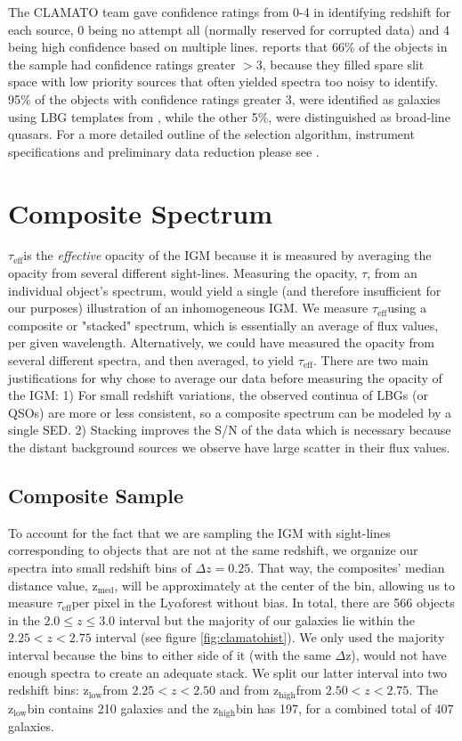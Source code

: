 \documentclass[preprint2,times,tighten]{aastex6}
\newcommand{\teff}{$\tau_\mathrm{eff}$\space}
\newcommand{\lya}{Ly$\alpha$\space}
\newcommand{\zem}{$\mathrm{z_{med}}$\space}
\newcommand{\hiz}{$\mathrm{z_{high}}$\space}
\newcommand{\loz}{$\mathrm{z_{low}}$\space}
\begin{document}
The CLAMATO team gave confidence ratings from 0-4 in identifying redshift for each source, 0 being no attempt all (normally reserved for corrupted data) and 4 being high confidence based on multiple lines. \cite{lee_first_2018} reports that 66\% of the objects in the sample had confidence ratings greater $> 3$, because they filled spare slit space with low priority sources that often yielded spectra too noisy to identify. 95\% of the objects with confidence ratings greater 3, were identified as galaxies using LBG templates from \cite{shapley_rest-frame_2003}, while the other 5\%, were distinguished as broad-line quasars. For a more detailed outline of the selection algorithm, instrument specifications and preliminary data reduction please see \cite{lee_first_2018}. 


\section{Composite Spectrum}%
\label{sec:composite}

\teff is the \textit{effective} opacity of the IGM because it is measured by averaging the opacity from several different sight-lines. Measuring the opacity, $\tau$, from an individual object's spectrum, would yield a single (and therefore insufficient for our purposes) illustration of an inhomogeneous IGM. We measure \teff using a composite or "stacked" spectrum, which is essentially an average of flux values, per given wavelength. Alternatively, we could have measured the opacity from several different spectra, and then averaged, to yield \teff. There are two main justifications for why chose to average our data before measuring the opacity of the IGM: 1) For small redshift variations, the observed continua of LBGs (or QSOs) are more or less consistent, so a composite spectrum can be modeled by a single SED. 2) Stacking improves the S/N of the data which is necessary because the distant background sources we observe have large scatter in their flux values.

\subsection{Composite Sample}
\label{subsec:reduction}

To account for the fact that we are sampling the IGM with sight-lines corresponding to objects that are not at the same redshift, we organize our spectra into small redshift bins of $\Delta z = 0.25$. That way, the composites' median distance value, \zem, will be approximately at the center of the bin, allowing us to measure \teff per pixel in the \lya forest without bias. In total, there are 566 objects in the $2.0 \leq z \leq 3.0$ interval but the majority of our galaxies lie within the $2.25 < z < 2.75$ interval (see figure \ref{fig:clamatohist}). We only used the majority interval because the bins to either side of it (with the same $\Delta$z), would not have enough spectra to create an adequate stack. We split our latter interval into two redshift bins: \loz from $2.25 < z < 2.50$ and from \hiz from $2.50 < z < 2.75$. The \loz bin contains 210 galaxies and the \hiz bin has 197, for a combined total of 407 galaxies.
\end{document}

